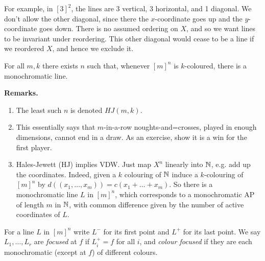 \documentclass[10pt,a4paper]{article}
\begin{document}
For example, in $[3]^2$, the lines are 3 vertical, 3 horizontal, and 1 diagonal. We don't allow the other diagonal, since there the $x$-coordinate goes up and the $y$-coordinate goes down. There is no assumed ordering on $X$, and so we want lines to be invariant under reordering. This other diagonal would cease to be a line if we reordered $X$, and hence we exclude it.
\begin{theorem}
  For all $m, k$ there exists $n$ such that, whenever $[m]^n$ is $k$-coloured, there is a monochromatic line.
\end{theorem}
\textbf{Remarks.}
\begin{enumerate}
  \item The least such $n$ is denoted $HJ(m,k)$.
  \item This essentially says that $m$-in-a-row noughts-and=crosses, played in enough dimensions, cannot end in a draw. As an exercise, show it is a win for the first player.
  \item Hales-Jewett (HJ) implies VDW. Just map $X^n$ linearly into $\mathbb{N}$, e.g. add up the coordinates. Indeed, given a $k$ colouring of $\mathbb{N}$ induce a $k$-colouring of $[m]^n$ by $d((x_1, \ldots, x_m)) = c(x_1+\ldots+x_m)$. So there is a monochromatic line $L$ in $[m]^n$, which corresponds to a monochromatic AP of length $m$ in $\mathbb{N}$, with common difference given by the number of active coordinates of $L$.
\end{enumerate}
For a line $L$ in $[m]^n$ write $L^-$ for its first point and $L^+$ for its last point. We say $L_1, \ldots, L_r$ are \emph{focused} at $f$ if $L_i^+ = f$ for all $i$, and \emph{colour focused} if they are each monochromatic (except at $f$) of different colours.
\end{document}
